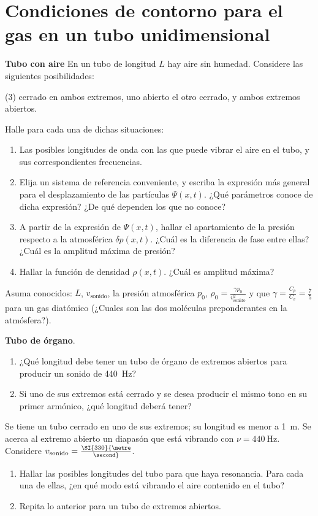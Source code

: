 \section*{Condiciones de contorno para el gas en un tubo unidimensional}


\item \textbf{Tubo con aire}
En un tubo de longitud $L$ hay aire sin humedad.
Considere las siguientes posibilidades: 
\begin{tasks}(3)
	\task cerrado en ambos extremos,
	\task uno abierto el otro cerrado, y
	\task ambos extremos abiertos.
\end{tasks}
Halle para cada una de dichas situaciones: 
\begin{enumerate}
	\item Las posibles longitudes de onda con las que puede vibrar el aire en el tubo, y sus correspondientes frecuencias. 
	\item Elija un sistema de referencia conveniente, y escriba la expresión más general para el desplazamiento de las partículas $\Psi(x,t)$.
	¿Qué parámetros conoce de dicha expresión?
	¿De qué dependen los que no conoce? 
	\item A partir de la expresión de $\Psi(x,t)$, hallar el apartamiento de la presión respecto a la atmosférica $\delta p(x,t)$.
	¿Cuál es la diferencia de fase entre ellas?
	¿Cuál es la amplitud máxima de presión? 
	\item Hallar la función de densidad $\rho(x,t)$.
	¿Cuál es amplitud máxima?
\end{enumerate}
Asuma conocidos: $L$, $v_\text{sonido}$, la presión atmosférica $p_0$, $\rho_{0}= \frac{ \gamma p_0 }{ v_\text{sonido}^2}$ y que $\gamma= \frac{C_p}{C_v}= \frac{7}{5}$ para un gas diatómico (¿Cuales son las dos moléculas preponderantes en la atmósfera?).


\item \textbf{Tubo de órgano}. 
\begin{enumerate}
\item ¿Qué longitud debe tener un tubo de órgano de extremos abiertos para producir un sonido de \SI{440}{\hertz}? 
\item Si uno de sus extremos está cerrado y se desea producir el mismo tono en su primer armónico, ¿qué longitud deberá tener?
\end{enumerate}


\item Se tiene un tubo cerrado en uno de sus extremos; su longitud es menor a \SI{1}{\metre}.
Se acerca al extremo abierto un diapasón que está vibrando con $\nu = \SI{440}{\hertz}$.
Considere $v_\text{sonido} = \SI{330}{\metre\over\second}$.
\begin{enumerate}
	\item Hallar las posibles longitudes del tubo para que haya resonancia.
	Para cada una de ellas, ¿en qué modo está vibrando el aire contenido en el tubo? 
	\item Repita lo anterior para un tubo de extremos abiertos.
\end{enumerate}


